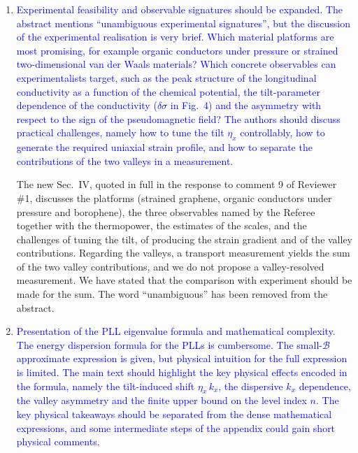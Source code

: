 \documentclass[aps,prb,onecolumn,nofootinbib,citeautoscript,10pt]{revtex4-2}
\begin{document}
\begin{enumerate}
The new text quoted in the response to comment 5 of Reviewer \#1 gives the conditions under which the relations hold and identifies where the deviations are located. In particular, the deviations are concentrated within about $T$ of the extrema of the PLL bands and of the end points of the branches. We have also examined the question about larger fields. Within the range of validity of the continuum model, a larger pseudomagnetic field breaks the Mott relation more strongly at a given temperature, because the level spacing grows as $\sqrt{|\mathcal B|}$ and the relation is controlled by the ratio of the temperature to this spacing. This is quantified in the new table. The Wiedemann-Franz law is more robust.\item \textcolor{blue}{Experimental feasibility and observable signatures should be expanded. The abstract mentions ``unambiguous experimental signatures'', but the discussion of the experimental realisation is very brief. Which material platforms are most promising, for example organic conductors under pressure or strained two-dimensional van der Waals materials? Which concrete observables can experimentalists target, such as the peak structure of the longitudinal conductivity as a function of the chemical potential, the tilt-parameter dependence of the conductivity ($\delta\sigma$ in Fig.~4) and the asymmetry with respect to the sign of the pseudomagnetic field? The authors should discuss practical challenges, namely how to tune the tilt $\eta_x$ controllably, how to generate the required uniaxial strain profile, and how to separate the contributions of the two valleys in a measurement.}

The new Sec.~IV, quoted in full in the response to comment 9 of Reviewer \#1, discusses the platforms (strained graphene, organic conductors under pressure and borophene), the three observables named by the Referee together with the thermopower, the estimates of the scales, and the challenges of tuning the tilt, of producing the strain gradient and of the valley contributions. Regarding the valleys, a transport measurement yields the sum of the two valley contributions, and we do not propose a valley-resolved measurement. We have stated that the comparison with experiment should be made for the sum. The word ``unambiguous'' has been removed from the abstract.\item \textcolor{blue}{Presentation of the PLL eigenvalue formula and mathematical complexity. The energy dispersion formula for the PLLs is cumbersome. The small-$\mathcal B$ approximate expression is given, but physical intuition for the full expression is limited. The main text should highlight the key physical effects encoded in the formula, namely the tilt-induced shift $\eta_x\,k_x$, the dispersive $k_x$ dependence, the valley asymmetry and the finite upper bound on the level index $n$. The key physical takeaways should be separated from the dense mathematical expressions, and some intermediate steps of the appendix could gain short physical comments.}


\end{enumerate}
\end{document}
